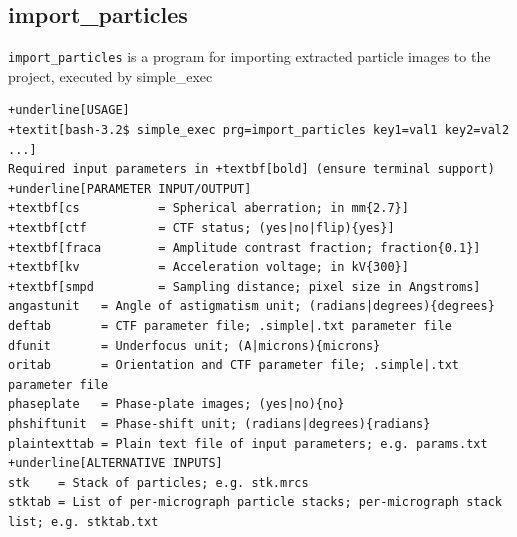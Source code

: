 \documentclass[a4paper,11pt]{article}
\newcommand{\prgname}[1]{\textcolor{NavyBlue}{\texttt{#1}}}
\begin{document}
\subsection{import\_particles}
\label{import_particles}
\prgname{import\_particles} is a program for importing extracted particle images to the project, executed by simple\_exec
\begin{Verbatim}[commandchars=+\[\],fontsize=\small,breaklines=true]
+underline[USAGE]
+textit[bash-3.2$ simple_exec prg=import_particles key1=val1 key2=val2 ...]
Required input parameters in +textbf[bold] (ensure terminal support)
+underline[PARAMETER INPUT/OUTPUT]
+textbf[cs           = Spherical aberration; in mm{2.7}]
+textbf[ctf          = CTF status; (yes|no|flip){yes}]
+textbf[fraca        = Amplitude contrast fraction; fraction{0.1}]
+textbf[kv           = Acceleration voltage; in kV{300}]
+textbf[smpd         = Sampling distance; pixel size in Angstroms]
angastunit   = Angle of astigmatism unit; (radians|degrees){degrees}
deftab       = CTF parameter file; .simple|.txt parameter file
dfunit       = Underfocus unit; (A|microns){microns}
oritab       = Orientation and CTF parameter file; .simple|.txt parameter file
phaseplate   = Phase-plate images; (yes|no){no}
phshiftunit  = Phase-shift unit; (radians|degrees){radians}
plaintexttab = Plain text file of input parameters; e.g. params.txt
+underline[ALTERNATIVE INPUTS]
stk    = Stack of particles; e.g. stk.mrcs
stktab = List of per-micrograph particle stacks; per-micrograph stack list; e.g. stktab.txt
\end{Verbatim}
\end{document}
